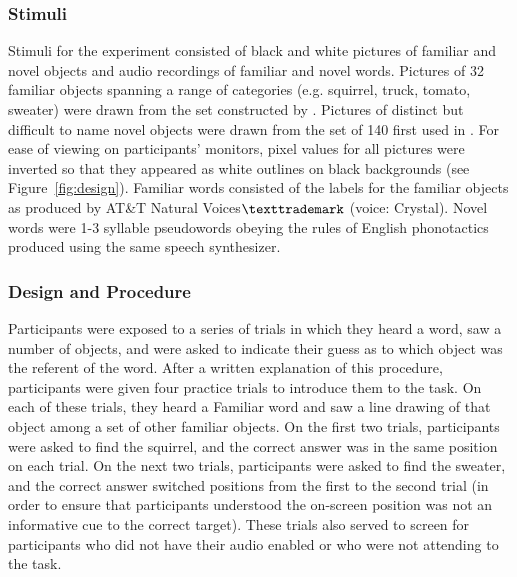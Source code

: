 \documentclass[man,floatsintext]{apa6}
\begin{document}
\subsubsection{Stimuli}

Stimuli for the experiment consisted of black and white pictures of familiar and novel objects and audio recordings of familiar and novel words. Pictures of 32 familiar objects spanning a range of categories (e.g. squirrel, truck, tomato, sweater) were drawn from the set constructed by . Pictures of distinct but difficult to name novel objects were drawn from the set of 140 first used in . For ease of viewing on participants' monitors, pixel values for all pictures were inverted so that they appeared as white outlines on black backgrounds (see Figure~\ref{fig:design}). Familiar words consisted of the labels for the familiar objects as produced by AT\&T Natural Voices$\texttrademark$ (voice: Crystal). Novel words were 1-3 syllable pseudowords obeying the rules of English phonotactics produced using the same speech synthesizer. 

\subsubsection{Design and Procedure}

Participants were exposed to a series of trials in which they heard a word, saw a number of objects, and were asked to indicate their guess as to which object was the referent of the word. After a written explanation of this procedure, participants were given four practice trials to introduce them to the task. On each of these trials, they heard a Familiar word and saw a line drawing of that object among a set of other familiar objects. On the first two trials, participants were asked to find the squirrel, and the correct answer was in the same position on each trial. On the next two trials, participants were asked to find the sweater, and the correct answer switched positions from the first to the second trial (in order to ensure that participants understood the on-screen position was not an informative cue to the correct target). These trials also served to screen for participants who did not have their audio enabled or who were not attending to the task.
\end{document}
